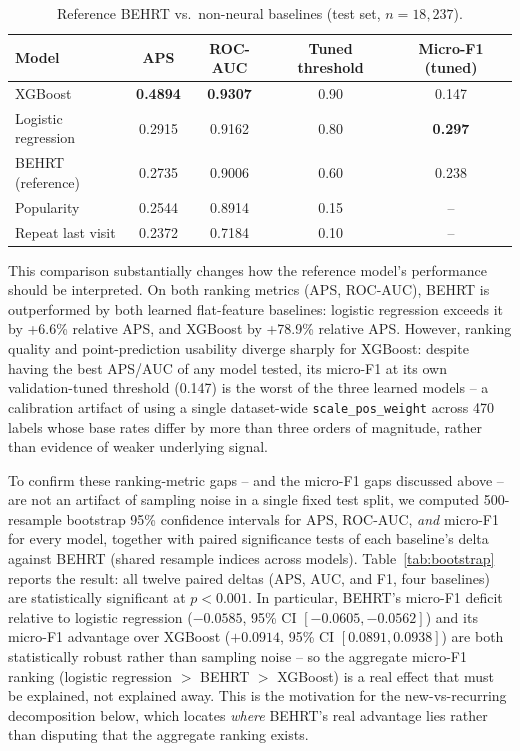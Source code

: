 \documentclass[11pt]{article}
\begin{document}
\begin{table}[h]
\centering
\caption{Reference BEHRT vs.\ non-neural baselines (test set, $n=18{,}237$).}
\label{tab:baselines}
\begin{tabular}{lcccc}
\toprule
Model & APS & ROC-AUC & Tuned threshold & Micro-F1 (tuned) \\
\midrule
XGBoost & \textbf{0.4894} & \textbf{0.9307} & 0.90 & 0.147 \\
Logistic regression & 0.2915 & 0.9162 & 0.80 & \textbf{0.297} \\
BEHRT (reference) & 0.2735 & 0.9006 & 0.60 & 0.238 \\
Popularity & 0.2544 & 0.8914 & 0.15 & -- \\
Repeat last visit & 0.2372 & 0.7184 & 0.10 & -- \\
\bottomrule
\end{tabular}
\end{table}

This comparison substantially changes how the reference model's performance
should be interpreted. On both ranking metrics (APS, ROC-AUC), BEHRT is
outperformed by both learned flat-feature baselines: logistic regression
exceeds it by +6.6\% relative APS, and XGBoost by +78.9\% relative APS.
However, ranking quality and point-prediction usability diverge sharply for
XGBoost: despite having the best APS/AUC of any model tested, its micro-F1 at
its own validation-tuned threshold (0.147) is the worst of the three learned
models -- a calibration artifact of using a single dataset-wide
\texttt{scale\_pos\_weight} across 470 labels whose base rates differ by more
than three orders of magnitude, rather than evidence of weaker underlying
signal.

To confirm these ranking-metric gaps -- and the micro-F1 gaps discussed
above -- are not an artifact of sampling noise in a single fixed test split,
we computed 500-resample bootstrap 95\% confidence intervals for APS,
ROC-AUC, \emph{and} micro-F1 for every model, together with paired
significance tests of each baseline's delta against BEHRT (shared resample
indices across models). Table~\ref{tab:bootstrap} reports the result: all
twelve paired deltas (APS, AUC, and F1, four baselines) are statistically
significant at $p<0.001$. In particular, BEHRT's micro-F1 deficit relative to
logistic regression ($-0.0585$, 95\% CI $[-0.0605,-0.0562]$) and its micro-F1
advantage over XGBoost ($+0.0914$, 95\% CI $[0.0891,0.0938]$) are both
statistically robust rather than sampling noise -- so the aggregate micro-F1
ranking (logistic regression $>$ BEHRT $>$ XGBoost) is a real effect that
must be explained, not explained away. This is the motivation for the
new-vs-recurring decomposition below, which locates \emph{where} BEHRT's
real advantage lies rather than disputing that the aggregate ranking exists.
\end{document}
